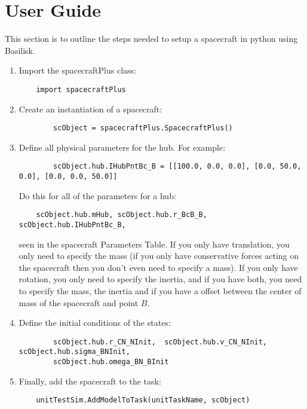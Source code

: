 
\section{User Guide}

This section is to outline the steps needed to setup a spacecraft in python using Basilisk.

\begin{enumerate}
	\item Import the spacecraftPlus class: 
	\begin{verbatim}
	import spacecraftPlus
	\end{verbatim}
	\item Create an instantiation of a spacecraft: 
	\begin{verbatim}
		scObject = spacecraftPlus.SpacecraftPlus()
	\end{verbatim}
	\item Define all physical parameters for the hub. For example: 
	\begin{verbatim}
		scObject.hub.IHubPntBc_B = [[100.0, 0.0, 0.0], [0.0, 50.0, 0.0], [0.0, 0.0, 50.0]]
	\end{verbatim}
	Do this for all of the parameters for a hub: 
	\begin{verbatim}
	scObject.hub.mHub, scObject.hub.r_BcB_B, scObject.hub.IHubPntBc_B,
	\end{verbatim}
	seen in the spacecraft Parameters Table. If you only have translation, you only need to specify the mass (if you only have conservative forces acting on the spacecraft then you don't even need to specify a mass). If you only have rotation, you only need to specify the inertia, and if you have both, you need to specify the mass, the inertia and if you have a offset between the center of mass of the spacecraft and point $B$.
	\item Define the initial conditions of the states: 
	\begin{verbatim}
		scObject.hub.r_CN_NInit,  scObject.hub.v_CN_NInit, scObject.hub.sigma_BNInit, 
		scObject.hub.omega_BN_BInit
		\end{verbatim}
	\item Finally, add the spacecraft to the task: 
	\begin{verbatim}
	unitTestSim.AddModelToTask(unitTaskName, scObject)
	\end{verbatim}
\end{enumerate}
